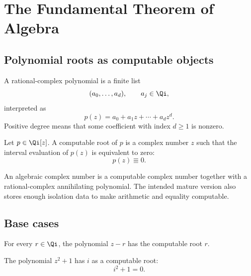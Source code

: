 \chapter{The Fundamental Theorem of Algebra}

\section{Polynomial roots as computable objects}

\begin{definition}\label{def:qcomplex-poly}
A rational-complex polynomial is a finite list
\[
  (a_0,\ldots,a_d),\qquad a_j\in\Qi,
\]
interpreted as
\[
  p(z)=a_0+a_1z+\cdots+a_dz^d.
\]
Positive degree means that some coefficient with index \(d\ge 1\) is
nonzero.
\end{definition}

\begin{definition}\label{def:computable-root}
Let \(p\in\Qi[z]\).  A computable root of \(p\) is a complex number \(z\)
such that the interval evaluation of \(p(z)\) is equivalent to zero:
\[
  p(z)\Equiv 0.
\]
\end{definition}

\begin{definition}\label{def:algebraic-complex}
An algebraic complex number is a computable complex number together with a
rational-complex annihilating polynomial.  The intended mature version also
stores enough isolation data to make arithmetic and equality computable.
\end{definition}

\section{Base cases}

\begin{theorem}\label{thm:monic-linear-root}
\leanok
For every \(r\in\Qi\), the polynomial \(z-r\) has the computable root \(r\).
\end{theorem}

\begin{theorem}\label{thm:z2-plus-one-root}
\leanok
The polynomial \(z^2+1\) has \(i\) as a computable root:
\[
  i^2+1=0.
\]
\end{theorem}

